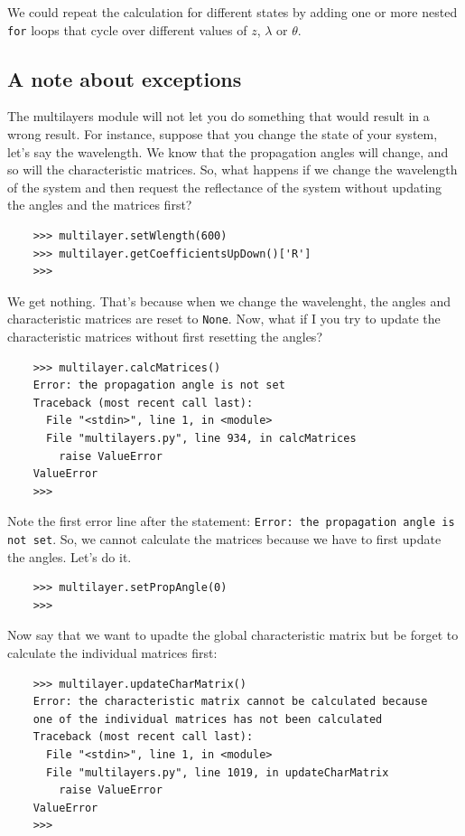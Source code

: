 \documentclass[a4paper,11pt,aps,final]{revtex4}
\begin{document}
We could repeat the calculation for different states by adding one or more nested \texttt{for} loops that cycle over different values of $z$, $\lambda$ or $\theta$.

\subsection{A note about exceptions}

The \textsf{multilayers} module will not let you do something that would result in a wrong result. For instance, suppose that you change the state of your system, let's say the wavelength. We know that the propagation angles will change, and so will the characteristic matrices. So, what happens if we change the wavelength of the system and then request the reflectance of the system without updating the angles and the matrices first?

\begin{verbatim}
    >>> multilayer.setWlength(600)
    >>> multilayer.getCoefficientsUpDown()['R']
    >>>
\end{verbatim}

We get nothing. That's because when we change the wavelenght, the angles and characteristic matrices are reset to \texttt{None}. Now, what if I you try to update the characteristic matrices without first resetting the angles?

\begin{verbatim}
    >>> multilayer.calcMatrices()
    Error: the propagation angle is not set
    Traceback (most recent call last):
      File "<stdin>", line 1, in <module>
      File "multilayers.py", line 934, in calcMatrices
        raise ValueError
    ValueError
    >>>
\end{verbatim}

Note the first error line after the statement: \texttt{Error: the propagation angle is not set}. So, we cannot calculate the matrices because we have to first update the angles. Let's do it.

\begin{verbatim}
    >>> multilayer.setPropAngle(0)
    >>>
\end{verbatim}

Now say that we want to upadte the global characteristic matrix but be forget to calculate the individual matrices first:

\begin{verbatim}
    >>> multilayer.updateCharMatrix()
    Error: the characteristic matrix cannot be calculated because
    one of the individual matrices has not been calculated
    Traceback (most recent call last):
      File "<stdin>", line 1, in <module>
      File "multilayers.py", line 1019, in updateCharMatrix
        raise ValueError
    ValueError
    >>>
\end{verbatim}
\end{document}

